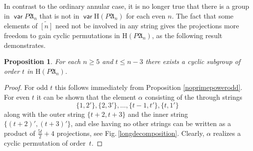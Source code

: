 \documentclass[11pt,reqno]{amsart}
\DeclareMathOperator{\var}{\mathsf{var}}
\numberwithin{equation}{section}
\newtheorem{Prop}[Thm]{Proposition}
\theoremstyle{remark}
\def\al{\alpha}
\def\H{\mathrm H}
\def\A{\mathfrak{A}}
\def\wt{\widetilde}
\begin{document}
In contrast to the ordinary annular case, it is no longer true
that there is a group in $\var P\A_n$ that is not in
$\var\H(P\A_n)$ for each even $n$. The fact that some elements of
$\wt{[n]}$ need not be involved in any string gives the
projections more freedom to gain cyclic permutations in
$\H(P\A_n)$, as the following result demonstrates.

\begin{Prop}
\label{partialannular} For each $n\ge 5$ and $t\le n-3$ there
exists a cyclic subgroup of order $t$ in $\H(P\A_n)$.
\end{Prop}

\begin{proof}
For odd $t$ this follows immediately from Proposition
\ref{noprimepowerodd}. For even $t$ it can be shown that the
element $\al$ consisting of the through strings
$$\{1,2'\}, \{2,3'\},\dots,\{t-1,t'\},\{t,1'\}$$
along with the outer string $\{t{+}2,t{+}3\}$ and the inner string
$\{(t{+}2)',(t{+}3)'\}$, and else having no other strings can be
written as a product of $\frac{5t}2 + 4$ projections, see
Fig.\,\ref{longdecomposition}. Clearly, $\al$ realizes a cyclic
permutation of order~$t$.
\end{proof}
\end{document}
